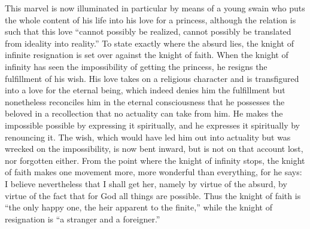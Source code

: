 \documentclass[12pt,a4paper,openany]{book}
\begin{document}
This marvel is now illuminated in particular by means of a young swain
who puts the whole content of his life into his love for a princess,
although the relation is such that this love ``cannot possibly be
realized, cannot possibly be translated from ideality into reality.'' To
state exactly where the absurd lies, the knight of infinite resignation
is set over against the knight of faith. When the knight of infinity has
seen the impossibility of getting the princess, he resigns the fulfillment
of his wish. His love takes on a religious character and is transfigured
into a love for the eternal being, which indeed denies him the
fulfillment but nonetheless reconciles him in the eternal consciousness
that he possesses the beloved in a recollection that no actuality can
take from him. He makes the impossible possible by expressing it
spiritually, and he expresses it spiritually by renouncing it. The wish,
which would have led him out into actuality but was wrecked on the
impossibility, is now bent inward, but is not on that account lost,
nor forgotten either. From the point where %
the knight of infinity stops, the knight of faith makes one movement
more, more wonderful than everything, for he says: I believe nevertheless
that I shall get her, namely by virtue of the absurd, by virtue of the
fact that for God all things are possible. Thus the knight of faith is
``the only happy one, the heir apparent to the finite,'' while the knight
of resignation is ``a stranger and a foreigner.''
\end{document}
